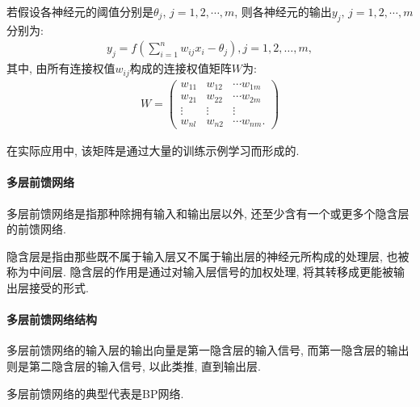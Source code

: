 若假设各神经元的阈值分别是$\theta_j,\, j=1,2,\cdots,m$, 则各神经元的输出$y_j,\, j=1,2, \cdots, m$分别为:
\begin{align}
    {y}_{{j}}={f}\left(\sum_{{i}=1}^{{n}} w_{{ij}} {x}_{{i}}-\theta_{{j}}\right), {j}=1,2, \ldots, {m},
\end{align}
其中, 由所有连接权值$w_{ij}$构成的连接权值矩阵$W$为:
\begin{align}
    W=\left(
  \begin{array}{lll}
  {w_{11}} & {w_{12}} & {\cdots w_{1 {m}}} \\
  {w_{21}} & {w_{22}} & {\cdots w_{2 {m}}} \\
  {\vdots} & {\vdots} & {\vdots} \\ {w_{{nl}}} & {w_{{n} 2}} & \cdots w_{{nm}}.
  \end{array}
  \right)
\end{align}

在实际应用中, 该矩阵是通过大量的训练示例学习而形成的.
\paragraph{多层前馈网络}
多层前馈网络是指那种除拥有输入和输出层以外, 还至少含有一个或更多个隐含层的前馈网络.

隐含层是指由那些既不属于输入层又不属于输出层的神经元所构成的处理层, 也被称为中间层. 隐含层的作用是通过对输入层信号的加权处理, 将其转移成更能被输出层接受的形式.
\paragraph{多层前馈网络结构}

多层前馈网络的输入层的输出向量是第一隐含层的输入信号, 而第一隐含层的输出则是第二隐含层的输入信号, 以此类推, 直到输出层.
\begin{remark}
    多层前馈网络的典型代表是BP网络.
\end{remark}

